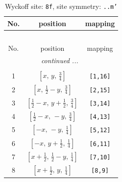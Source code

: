 \documentclass[fleqn,8pt]{jsarticle}
\begin{document}
\begin{longtable}{ccc}
\caption{Wyckoff site: {\tt 8f}, site symmetry: {\tt ..m'}}
 \\
 \hline \hline
No. & position & mapping \\ \hline \endfirsthead

\multicolumn{2}{l}{\tablename\ \thetable{}} \\
 \hline \hline
No. & position & mapping \\ \hline \endhead

 \hline \hline
\multicolumn{2}{r}{\footnotesize\it continued ...} \\ \endfoot

 \hline \hline
\multicolumn{2}{r}{} \\ \endlastfoot

1 & $\left[ x,\, y,\, \frac{3}{4} \right]$ & {\tt [1,16]} \\ \hline
2 & $\left[ x,\, \frac{1}{2} - y,\, \frac{3}{4} \right]$ & {\tt [2,15]} \\ \hline
3 & $\left[ \frac{1}{2} - x,\, y + \frac{1}{2},\, \frac{3}{4} \right]$ & {\tt [3,14]} \\ \hline
4 & $\left[ \frac{1}{2} - x,\, - y,\, \frac{3}{4} \right]$ & {\tt [4,13]} \\ \hline
5 & $\left[ - x,\, - y,\, \frac{1}{4} \right]$ & {\tt [5,12]} \\ \hline
6 & $\left[ - x,\, y + \frac{1}{2},\, \frac{1}{4} \right]$ & {\tt [6,11]} \\ \hline
7 & $\left[ x + \frac{1}{2},\, \frac{1}{2} - y,\, \frac{1}{4} \right]$ & {\tt [7,10]} \\ \hline
8 & $\left[ x + \frac{1}{2},\, y,\, \frac{1}{4} \right]$ & {\tt [8,9]} \\
\end{longtable}
\renewcommand{\arraystretch}{1.2}
\end{document}
